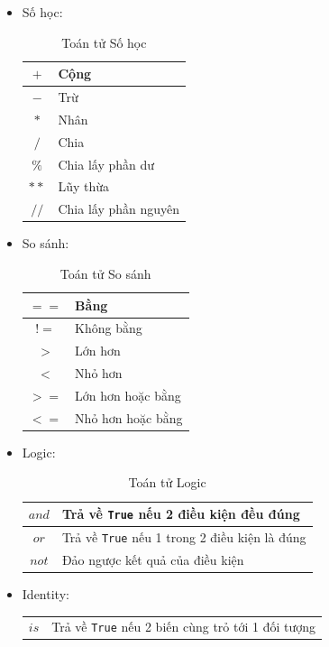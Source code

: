 \begin{itemize}
	\item Số học:
	\begin{table}[!ht]
		\centering
		\begin{tabular}{|c|l|}
			\hline
			$+$ & Cộng\\
			\hline
			$-$ & Trừ\\
			\hline
			$*$ & Nhân\\
			\hline
			$/$ & Chia\\
			\hline
			$\%$ & Chia lấy phần dư\\
			\hline
			$**$ & Lũy thừa\\
			\hline
			$//$ & Chia lấy phần nguyên\\
			\hline
		\end{tabular}
		\caption{Toán tử Số học}
	\end{table}
	\item So sánh:
	\begin{table}[!ht]
		\centering
		\begin{tabular}{|c|l|}
			\hline
			$==$ & Bằng\\
			\hline
			$!=$ & Không bằng\\
			\hline
			$>$ & Lớn hơn\\
			\hline
			$<$ & Nhỏ hơn\\
			\hline
			$>=$ & Lớn hơn hoặc bằng\\
			\hline
			$<=$ & Nhỏ hơn hoặc bằng\\
			\hline
		\end{tabular}
		\caption{Toán tử So sánh}
	\end{table}
	\item Logic:
	\begin{table}[!ht]
		\centering
		\begin{tabular}{|c|l|}
			\hline
			$and$ & Trả về \texttt{True} nếu 2 điều kiện đều đúng\\
			\hline
			$or$ & Trả về \texttt{True} nếu 1 trong 2 điều kiện là đúng\\
			\hline
			$not$ & Đảo ngược kết quả của điều kiện\\
			\hline
		\end{tabular}
		\caption{Toán tử Logic}
	\end{table}
	\item Identity:
	\begin{table}[!ht]
		\centering
		\begin{tabular}{|c|l|}
			\hline
			$is$ & Trả về \texttt{True} nếu 2 biến cùng trỏ tới 1 đối tượng\\

\end{tabular}
\end{table}
\end{itemize}
